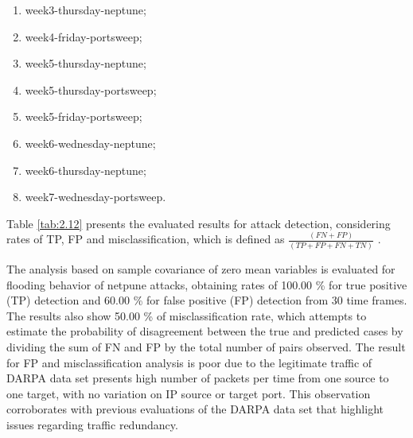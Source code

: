 \begin{enumerate}
	\item week3-thursday-neptune;
	\item week4-friday-portsweep;
	\item week5-thursday-neptune;
	\item week5-thursday-portsweep;
	\item week5-friday-portsweep;
	\item week6-wednesday-neptune;
	\item week6-thursday-neptune;
	\item week7-wednesday-portsweep.
\end{enumerate}

Table \ref{tab:2.12} presents the evaluated results for attack detection, considering rates of TP, FP \cite{fleiss2013statistical} and misclassification, which is defined as $\frac{(FN+FP)}{(TP+FP+FN+TN)}$ \cite{bhuyan2014network}. 

The analysis based on sample covariance of zero mean variables is evaluated for flooding behavior of netpune attacks, obtaining rates of 100.00 \% for true positive (TP) detection and 60.00 \% for false positive (FP) detection from 30 time frames. The results also show 50.00 \% of misclassification rate, which attempts to estimate the probability of disagreement between the true and predicted cases by dividing the sum of FN and FP by the total number of pairs observed. The result for FP and misclassification analysis is poor due to the legitimate traffic of DARPA data set presents high number of packets per time from one source to one target, with no variation on IP source or target port. This observation corroborates with previous evaluations of the DARPA data set that highlight issues regarding traffic redundancy. 

